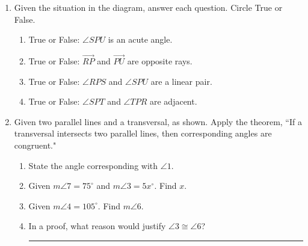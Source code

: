 \documentclass[12pt, oneside]{article}
\begin{document}
\begin{enumerate}

  \item Given the situation in the diagram, answer each question. Circle True or False. %
      \begin{flushleft}
    \end{flushleft}
    \begin{enumerate}
      \item True or False: $\angle SPU$ is an acute angle.
      \item True or False: $\overrightarrow{RP}$ and $\overrightarrow{PU}$ are opposite rays.
      \item True or False: $\angle RPS$ and $\angle SPU$ are a linear pair.
      \item True or False: $\angle SPT$ and $\angle TPR$ are adjacent.
    \end{enumerate}

  \item Given two parallel lines and a transversal, as shown. Apply the theorem, ``If a transversal intersects two parallel lines, then corresponding angles are congruent."
    \begin{center}
    \end{center}
    \begin{enumerate}
      \item State the angle corresponding with $\angle 1$. \bigskip
      \item Given $m\angle 7 = 75^\circ$ and $m\angle 3 = 5x^\circ$. Find $x$. \bigskip
      \item Given $m\angle 4 = 105^\circ$. Find $m\angle 6$. \bigskip
      \item In a proof, what reason would justify $\angle 3 \cong \angle 6$? \rule{6cm}{0.15mm}
    \end{enumerate}


\end{enumerate}
\end{document}
